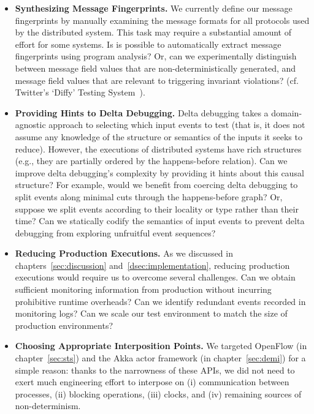 \begin{itemize}
\item \textbf{Synthesizing Message Fingerprints.} We currently define our message
fingerprints by manually examining the message formats for all protocols used
by the distributed system. This task may require a substantial amount of
effort for some systems. Is is possible to automatically extract
message fingerprints using program analysis? Or, can we experimentally
distinguish between message field values that are non-deterministically
generated, and message field values that are relevant to triggering invariant
violations? (cf. Twitter's `Diffy' Testing System~\cite{diffy}).

\item \textbf{Providing Hints to Delta Debugging.} Delta debugging takes a
domain-agnostic approach to selecting which input events to
test (that is, it does not assume any knowledge of the structure or semantics
of the inputs it seeks to reduce). However, the executions of distributed systems have
rich structures (e.g., they are partially ordered by the happens-before
relation). Can we improve delta debugging's complexity by
providing it hints about this causal structure? For example, would we benefit
from coercing delta debugging to split events along minimal cuts through the
happens-before graph? Or, suppose we split events according to their locality or type rather
than their time? Can we statically codify the semantics of input events to prevent delta
debugging from exploring unfruitful event sequences?

\item \textbf{Reducing Production Executions.} As we discussed in
chapters~\ref{sec:discussion} and~\ref{dsec:implementation}, reducing production
executions would require us to overcome several challenges. Can we obtain
sufficient monitoring information from production without incurring
prohibitive runtime overheads? Can we identify redundant events recorded in
monitoring logs? Can we scale our test environment to match the size of production
environments?

\item \textbf{Choosing Appropriate Interposition Points.} We targeted
OpenFlow (in chapter~\ref{sec:sts}) and the Akka actor framework (in
chapter~\ref{sec:demi}) for a simple reason: thanks to the narrowness of
these APIs, we did not need to exert much
engineering effort to interpose on (i) communication
between processes, (ii) blocking operations, (iii) clocks, and (iv) remaining sources of non-determinism.


\end{itemize}
